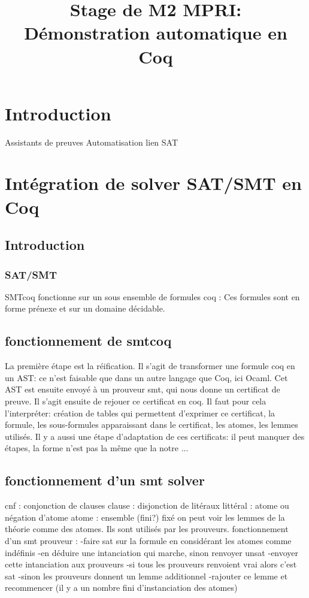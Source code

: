 \title{Stage de M2 MPRI: Démonstration automatique en Coq}

\section{Introduction}
Assistants de preuves 
Automatisation 
lien SAT

\newpage



\section{Intégration de solver SAT/SMT en Coq}

\subsection{Introduction}
\subsubsection{SAT/SMT}
SMTcoq fonctionne sur un sous ensemble de formules coq :
Ces formules sont en forme prénexe et sur un domaine décidable.

\subsection{fonctionnement de smtcoq}
La première étape est la réification. Il s'agit de transformer une formule coq en un AST:
ce n'est faisable que dans un autre langage que Coq, ici Ocaml.
Cet AST est ensuite envoyé à un prouveur smt, qui nous donne un certificat de preuve.
Il s'agit ensuite de rejouer ce certificat en coq. Il faut pour cela l'interpréter: création
de tables qui permettent d'exprimer ce certificat, la formule, les sous-formules apparaissant
dans le certificat, les atomes, les lemmes utilisés. Il y a aussi une étape d'adaptation de ces
certificats: il peut manquer des étapes, la forme n'est pas la même que la notre ...

\subsection{fonctionnement d'un smt solver}
cnf : conjonction de clauses
clause : disjonction de litéraux
littéral : atome ou négation d'atome
atome : ensemble (fini?) fixé
on peut voir les lemmes de la théorie comme des atomes. Ils sont utilisés par les prouveurs.
fonctionnement d'un smt prouveur :
-faire sat sur la formule en considérant les atomes comme indéfinis
-en déduire une intanciation qui marche, sinon renvoyer unsat
-envoyer cette intanciation aux prouveurs
-si tous les prouveurs renvoient vrai alors c'est sat
-sinon les prouveurs donnent un lemme additionnel
-rajouter ce lemme et recommencer (il y a un nombre fini d'instanciation des atomes)


